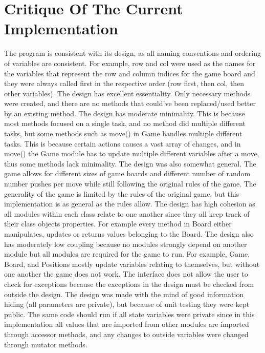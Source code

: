 \documentclass[12pt]{article}
\begin{document}
\section* {Critique Of The Current Implementation} {
The program is consistent with its design, as all naming conventions and ordering of variables are consistent. For example, row and col were used as the names for the variables that represent the row and column indices for the game board and they were always called first in the respective order (row first, then col, then other variables). The design has excellent essentiality. Only necessary methods were created, and there are no methods that could’ve been replaced/used better by an existing method. The design has moderate minimality. This is because most methods focused on a single task, and no method did multiple different tasks, but some methods such as move() in Game handles multiple different tasks. This is because certain actions causes a vast array of changes, and in move() the Game module has to update multiple different variables after a move, thus some methods lack minimality. The design was also somewhat general. The game allows for different sizes of game boards and different number of random number pushes per move while still following the original rules of the game. The generality of the game is limited by the rules of the original game, but this implementation is as general as the rules allow. The design has high cohesion as all modules within each class relate to one another since they all keep track of their class objects properties. For example every method in Board either manipulates, updates or returns values belonging to the Board. The design also has moderately low coupling because no modules strongly depend on another module but all modules are required for the game to run. For example, Game, Board, and Positions mostly update variables relating to themselves, but without one another the game does not work. The interface does not allow the user to check for exceptions because the exceptions in the design must be checked from outside the design. The design was made with the mind of good information hiding (all parameters are private), but because of unit testing they were kept public. The same code should run if all state variables were private since in this implementation all values that are imported from other modules are imported through accessor methods, and any changes to outside variables were changed through mutator methods.
}
\end{document}
